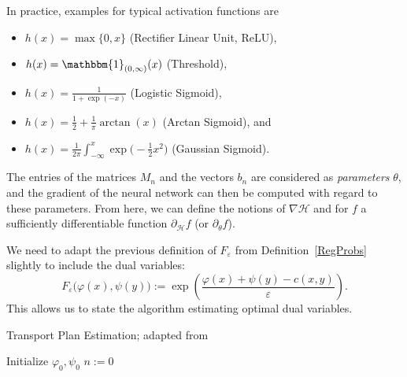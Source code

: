 \begin{remark}
	In practice, examples for typical activation functions are
	\begin{itemize}
		\item $h(x) = \max\{ 0 , x \}$ (Rectifier Linear Unit, ReLU),
		\item $h(x) = \mathbbm{1}_{(0, \infty)}(x)$ (Threshold),
		\item $h(x) = \frac{1}{1 + \exp(-x)}$ (Logistic Sigmoid),
		\item $h(x) = \frac{1}{2} + \frac{1}{\pi} \arctan(x)$ (Arctan Sigmoid), and
		\item $h(x) = \frac{1}{2\pi} \int_{-\infty}^x \exp\big(\!-\frac{1}{2} x^2 \big)$ (Gaussian Sigmoid).
	\end{itemize}
\end{remark}

The entries of the matrices $M_n$ and the vectors $b_n$ are considered as \textit{parameters} $\theta$, and the gradient of the neural network can then be computed with regard to these parameters. From here, we can define the notions of $\nabla \mathcal{H}$ and for $f$ a sufficiently differentiable function $\partial_{\mathcal{H}} f$ (or $\partial_\theta f$). 

We need to adapt the previous definition of $F_\varepsilon$ from Definition~\ref{RegProbs} slightly to include the dual variables:
\[ F_\varepsilon\big( \varphi(x), \psi(y) \big) := \exp\left( \frac{\varphi(x) + \psi(y) - c(x, y)}{\varepsilon} \right). \]
This allows us to state the algorithm estimating optimal dual variables.

\begin{algorithm}\label{OTPlanEstAlg}
	\caption{Transport Plan Estimation; adapted from\ {\cite[Algorithm~1]{Seg2018}}}
	Initialize $\varphi_0, \psi_0$\;
	$n := 0$\;
\end{algorithm}

